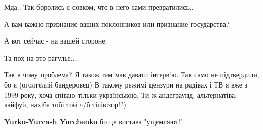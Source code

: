 \begin{itemize}
Мда.. Так боролись с совком, что в него сами превратились..


\begin{itemize}
 
А вам важно признание ваших поклонников или признание государства?
\end{itemize}

 
А вот сейчас - на вашей стороне.

 
Та пох на это рагулье....

 


Так в чому проблема? Я також там мав давати інтерв‘ю. Так само не підтвердили,
бо я (оголтєлий бандеровєц) В такому режимі цензури на радівах і ТВ я вже з
1999 року, хоча співаю тільки українською. Ти ж андеграунд, альтернатіва, -
кайфуй, нахіба тобі той ч/б тілівізор!?)

\begin{itemize}
 
\textbf{Yurko-Yurcash Yurchenko} бо це вистава "ущємляют!"

 

\end{itemize}
\end{itemize}
